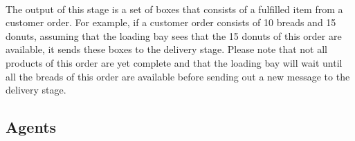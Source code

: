 \documentclass[11pt, a4paper]{article}
\begin{document}
\paragraph{}
The output of this stage is a set of boxes that consists of a fulfilled item from a customer order. For example, if a customer order consists of 10 breads and 15 donuts, assuming that the loading bay sees that the 15 donuts of this order are available, it sends these boxes to the delivery stage. Please note that not all products of this order are yet complete and that the loading bay will wait until all the breads of this order are available before sending out a new message to the delivery stage.

\hfill\break
\subsection{Agents}\label{PackagingAgents}
\end{document}
